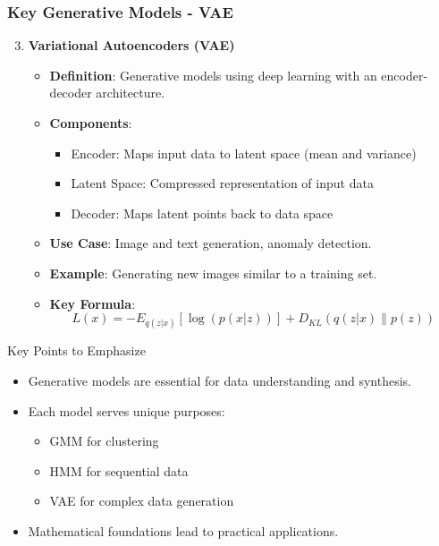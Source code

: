 \documentclass[aspectratio=169]{beamer}
\begin{document}
\begin{frame}[fragile]
    \frametitle{Key Generative Models - VAE}
    \begin{enumerate}
        \setcounter{enumi}{2} %
        \item \textbf{Variational Autoencoders (VAE)}  
        \begin{itemize}
            \item \textbf{Definition}: Generative models using deep learning with an encoder-decoder architecture.
            \item \textbf{Components}:
            \begin{itemize}
                \item Encoder: Maps input data to latent space (mean and variance)
                \item Latent Space: Compressed representation of input data
                \item Decoder: Maps latent points back to data space
            \end{itemize}
            \item \textbf{Use Case}: Image and text generation, anomaly detection.
            \item \textbf{Example}: Generating new images similar to a training set.
            \item \textbf{Key Formula}:
            \begin{equation}
                L(x) = -E_{q(z|x)}[\log(p(x|z))] + D_{KL}(q(z|x) \| p(z))
            \end{equation}
        \end{itemize}
    \end{enumerate}
    
    \begin{block}{Key Points to Emphasize}
        \begin{itemize}
            \item Generative models are essential for data understanding and synthesis.
            \item Each model serves unique purposes:
            \begin{itemize}
                \item GMM for clustering
                \item HMM for sequential data
                \item VAE for complex data generation
            \end{itemize}
            \item Mathematical foundations lead to practical applications.
        \end{itemize}
    \end{block}
\end{frame}
\end{document}
